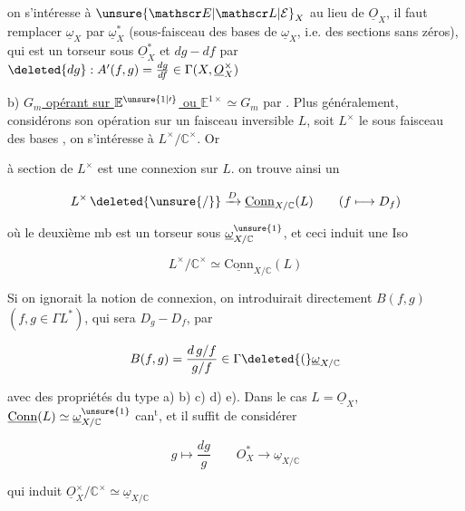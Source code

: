 

 on s'intéresse à $\unsure{\mathscr E|\mathscr L|\mathcal E}_X$ au lieu de $\underline O_X$, il faut remplacer $\underline\omega_X$ par $\underline\omega_X^*$ (sous-faisceau des bases de $\underline\omega_X$, i.e. des sections sans zéros), qui est un torseur sous $\underline O_X^*$ et $dg-df$ par $\deleted{dg}\mathrel{:} A'(f,g)=\frac{dg}{df}\in\Gamma(X,\underline O_X^{\times})$

b) \uline{$G_m$ opérant sur $\mathbb E^{\unsure{1|\prime}}$ ou $\mathbb E^{1\times}\simeq G_m$} par . Plus généralement, considérons son opération sur un faisceau inversible $L$, soit $L^{\times}$ le sous faisceau des bases , on s'intéresse à $L^{\times}/\mathbb C^{\times}$. Or

à  section de $L^{\times}$ est  une connexion sur $L$. on trouve ainsi un 

\[
 L^{\times}\,\deleted{\unsure{/}}\xrightarrow{D}\underline{\mathrm{Conn}}_{X/\mathbb C}(L)\qquad(f\longmapsto D_f)
\]

où le deuxième mb est un torseur sous $\underline\omega_{X/\mathbb C}^{\unsure{1}}$, et ceci induit une  Iso

\[
 L^{\times}/\mathbb C^{\times}\simeq\underline{\mathrm{Conn}}_{X/\mathbb C}(L)
\]

Si on ignorait la notion de connexion, on introduirait directement $B(f,g)$ $(f,g\in\Gamma L^*)$, qui sera  $D_g-D_f$, par

\[
 B(f,g)=\frac{d\,g/f}{g/f}\in\Gamma\deleted{(}\underline\omega_{X/\mathbb C}
\]

avec des propriétés du type a) b) c) d) e). Dans le cas $L=\underline O_X$, $\underline{\mathrm{Conn}}(L)\simeq\underline\omega^{\unsure{1}}_{X/\mathbb C}$ can$^{\mathrm{t}}$, et il suffit de considérer

\[
 g\longmapsto\frac{dg}{g}\qquad O_X^*\longrightarrow\underline\omega_{X/\mathbb C}
\]

qui induit $\underline O_{X}^{\times}/\mathbb C^{\times}\simeq\underline\omega_{X/\mathbb C}$

